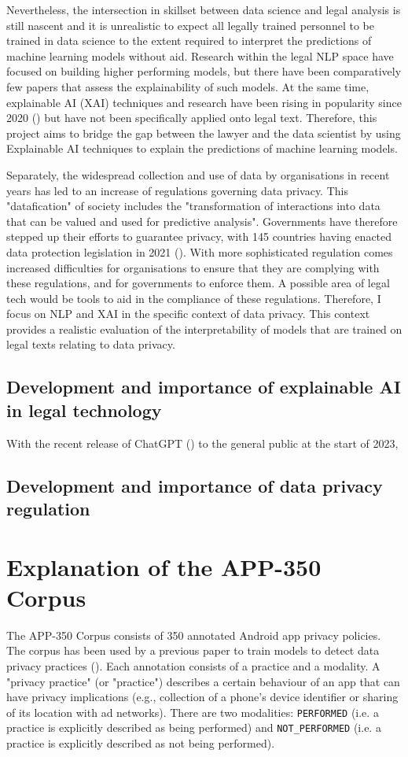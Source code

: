Nevertheless, the intersection in skillset between data science and legal analysis is still nascent and it is unrealistic to expect all legally trained personnel to be trained in data science to the extent required to interpret the predictions of machine learning models without aid. Research within the legal NLP space have focused on building higher performing models, but there have been comparatively few papers that assess the explainability of such models. At the same time, explainable AI (XAI) techniques and research have been rising in popularity since 2020 (\cite{linardatos2020}) but have not been specifically applied onto legal text. Therefore, this project aims to bridge the gap between the lawyer and the data scientist by using Explainable AI techniques to explain the predictions of machine learning models. 

Separately, the widespread collection and use of data by organisations in recent years has led to an increase of regulations governing data privacy. This "datafication" of society includes the "transformation of interactions into data that can be valued and used for predictive analysis". Governments have therefore stepped up their efforts to guarantee privacy, with 145 countries having enacted data protection legislation in 2021 (\cite{gstrein2022}). With more sophisticated regulation comes increased difficulties for organisations to ensure that they are complying with these regulations, and for governments to enforce them. A possible area of legal tech would be tools to aid in the compliance of these regulations. Therefore, I focus on NLP and XAI in the specific context of data privacy. This context provides a realistic evaluation of the interpretability of models that are trained on legal texts relating to data privacy.

\subsection{Development and importance of explainable AI in legal technology}
With the recent release of ChatGPT (\cite{openai}) to the general public at the start of 2023, 


\subsection{Development and importance of data privacy regulation}


\section{Explanation of the APP-350 Corpus}
The APP-350 Corpus consists of 350 annotated Android app privacy policies. The corpus has been used by a previous paper to train models to detect data privacy practices (\cite{zimmeck2019}). Each annotation consists of a practice and a modality. A "privacy practice" (or "practice") describes a certain behaviour of an app that can have privacy implications (e.g., collection of a phone's device identifier or sharing of its location with ad networks). There are two modalities: \texttt{PERFORMED} (i.e. a practice is explicitly described as being performed) and \texttt{NOT\_PERFORMED} (i.e. a practice is explicitly described as not being performed).

